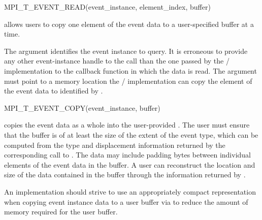 \begin{funcdef}{MPI\_T\_EVENT\_READ}{(\mbox{event\_instance}, \mbox{element\_index}, \mbox{buffer})}
\end{funcdef}

 allows users to copy one element of the event
data to a user-specified buffer at a time.

The  argument identifies the event instance to
query. It is erroneous to provide any other event-instance handle to the
call than the one passed by the \MPI/ implementation to the callback
function in which the data is read.  The  argument must point
to a memory location the \MPI/ implementation can copy the element
of the event data to identified by .

\begin{funcdef}{MPI\_T\_EVENT\_COPY}{(\mbox{event\_instance}, \mbox{buffer})}
\end{funcdef}

 copies the event data as a whole into the
user-provided . The user must ensure that the buffer is of
at least the size of the extent of the event type, which can be computed from the type and displacement information returned by the
corresponding call to . The data may
include padding bytes between individual elements of the event data in the
buffer. A user can reconstruct the location and size of the data contained
in the buffer through the information returned by
.

\begin{implementors}
    An implementation should strive to use an appropriately compact
    representation when copying event instance data to a user buffer via
     to reduce the amount of memory required for
    the user buffer.
\end{implementors}

